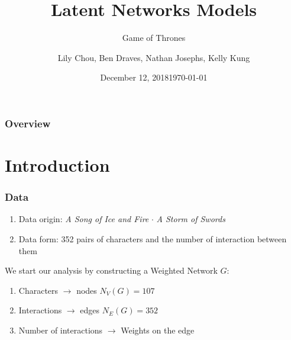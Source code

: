 \documentclass{beamer}
\title{Latent Networks Models}
\subtitle{Game of Thrones}
\author{Lily Chou, Ben Draves, Nathan Josephs, Kelly Kung}
\date{December 12, 2018}
\institute[Boston University] 
{
  Department of Mathematics and Statistics\\
  Boston University
  }
\date{\today}
\begin{document}
%
%
\begin{frame}
  \titlepage
\end{frame}
\begin{frame}
\frametitle{Overview}
\tableofcontents
\end{frame}

\section{Introduction}
\begin{frame}
 \frametitle{Data}
\begin{enumerate}
\item Data origin: \textit{A Song of Ice and Fire} $\cdot$ \textit{A Storm of Swords}
\item Data form: 352 pairs of characters and the number of interaction between them
\end{enumerate}

We start our analysis by constructing a Weighted Network $G$: 
\begin{enumerate}[i]
\item Characters $\rightarrow$ nodes 
\:  $N_V (G)= 107$
\item Interactions $\rightarrow$ edges   
\: $N_E (G) = 352$
\item Number of interactions $\rightarrow$ Weights on the edge
\end{enumerate}
\end{frame}
\end{document}
